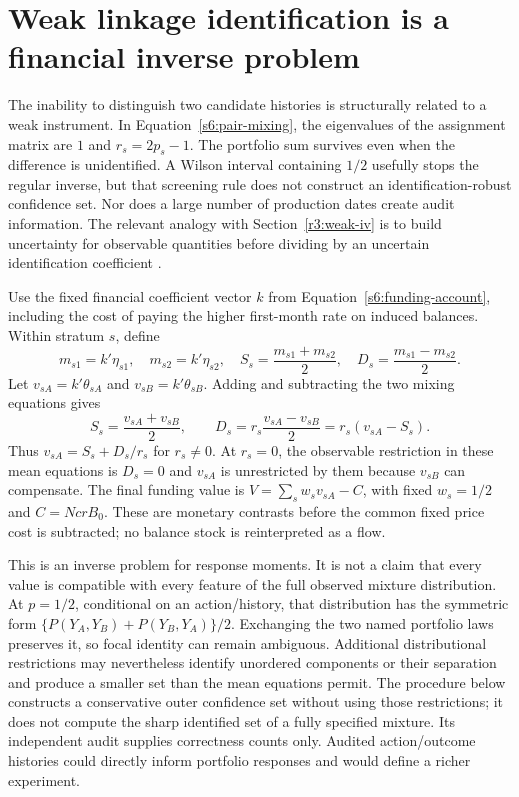 \section{Weak linkage identification is a financial inverse problem}
\label{s61:linkage-sets}
The inability to distinguish two candidate histories is structurally related
to a weak instrument. In Equation~\eqref{s6:pair-mixing}, the eigenvalues of
the assignment matrix are $1$ and $r_s=2p_s-1$. The portfolio sum survives
even when the difference is unidentified. A Wilson interval containing
$1/2$ usefully stops the regular inverse, but that screening rule does not
construct an identification-robust confidence set. Nor does a large number
of production dates create audit information. The relevant analogy with
Section~\ref{r3:weak-iv} is to build uncertainty for observable quantities
before dividing by an uncertain identification coefficient
\citep[Section 2D, Theorem 3]{staiger1994}.

Use the fixed financial coefficient vector $k$ from
Equation~\eqref{s6:funding-account}, including the cost of paying the higher
first-month rate on induced balances. Within stratum $s$, define
\[
 m_{s1}=k'\eta_{s1},\quad m_{s2}=k'\eta_{s2},\quad
 S_s=\frac{m_{s1}+m_{s2}}2,\quad D_s=\frac{m_{s1}-m_{s2}}2.
\]
Let $v_{sA}=k'\theta_{sA}$ and $v_{sB}=k'\theta_{sB}$. Adding and
subtracting the two mixing equations gives
\begin{equation}
 S_s=\frac{v_{sA}+v_{sB}}2,\qquad
 D_s=r_s\frac{v_{sA}-v_{sB}}2=r_s(v_{sA}-S_s).
 \label{s61:diagonal-map}
\end{equation}
Thus $v_{sA}=S_s+D_s/r_s$ for $r_s\ne0$. At $r_s=0$, the observable
restriction in these mean equations is $D_s=0$ and $v_{sA}$ is unrestricted
by them because $v_{sB}$ can compensate. The final funding value is
$V=\sum_s w_s v_{sA}-C$, with fixed $w_s=1/2$ and
$C=Nc r B_0$. These are monetary contrasts before the common fixed price
cost is subtracted; no balance stock is reinterpreted as a flow.

This is an inverse problem for response moments. It is not a claim that
every value is compatible with every feature of the full observed mixture
distribution. At $p=1/2$, conditional on an action/history, that distribution
has the symmetric form
$\{P(Y_A,Y_B)+P(Y_B,Y_A)\}/2$. Exchanging the two named portfolio laws
preserves it, so focal identity can remain ambiguous. Additional distributional
restrictions may nevertheless identify unordered components or their
separation and produce a smaller set than the mean equations permit.
The procedure below constructs a conservative outer confidence set without
using those restrictions; it does not compute the sharp identified set of
a fully specified mixture. Its independent audit supplies correctness counts
only. Audited action/outcome histories could directly inform portfolio
responses and would define a richer experiment.

